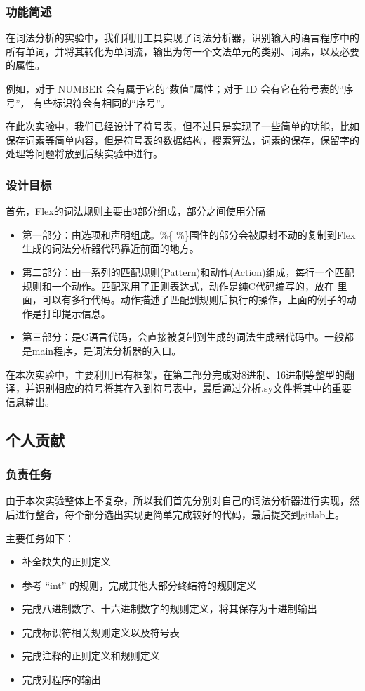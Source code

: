 \documentclass[UTF8,a4paper,10pt]{ctexart}
\begin{document}
\subsubsection{功能简述}
在词法分析的实验中，我们利用工具实现了词法分析器，识别输入的语言程序中的所有单词，并将其转化为单词流，输出为每一个文法单元的类别、词素，以及必要的属性。

例如，对于 NUMBER 会有属于它的“数值”属性；对于 ID 会有它在符号表的“序号”，
有些标识符会有相同的“序号”。

在此次实验中，我们已经设计了符号表，但不过只是实现了一些简单的功能，比如保存词素等简单内容，但是符号表的数据结构，搜索算法，词素的保存，保留字的处理等问题将放到后续实验中进行。

\subsubsection{设计目标}
首先，Flex的词法规则主要由3部分组成，部分之间使用\fbox{\%\%}分隔

\begin{itemize}
  \item 第一部分：由选项和声明组成。\%\{ \%\}围住的部分会被原封不动的复制到Flex生成的词法分析器代码靠近前面的地方。
  \item 第二部分：由一系列的匹配规则(Pattern)和动作(Action)组成，每行一个匹配规则和一个动作。匹配采用了正则表达式，动作是纯C代码编写的，放在{ }里面，可以有多行代码。动作描述了匹配到规则后执行的操作，上面的例子的动作是打印提示信息。
  \item 第三部分：是C语言代码，会直接被复制到生成的词法生成器代码中。一般都是main程序，是词法分析器的入口。
\end{itemize}

在本次实验中，主要利用已有框架，在第二部分完成对8进制、16进制等整型的翻译，并识别相应的符号将其存入到符号表中，最后通过分析.sy文件将其中的重要信息输出。



\subsection{个人贡献}
\subsubsection{负责任务}
由于本次实验整体上不复杂，所以我们首先分别对自己的词法分析器进行实现，然后进行整合，每个部分选出实现更简单完成较好的代码，最后提交到gitlab上。

主要任务如下：
\begin{itemize}
  \item 补全缺失的正则定义
  \item 参考 “int” 的规则，完成其他大部分终结符的规则定义
  \item 完成八进制数字、十六进制数字的规则定义，将其保存为十进制输出
  \item 完成标识符相关规则定义以及符号表
  \item 完成注释的正则定义和规则定义
  \item 完成对程序的输出
\end{itemize}
\end{document}
